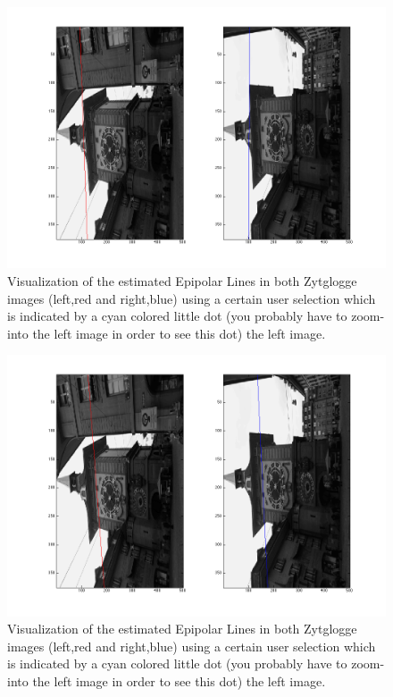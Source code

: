 \documentclass{paper}
\begin{document}
\begin{figure}[H]
\centering
\includegraphics[width=\textwidth]{figures/epi_zyt_2}
\caption{Visualization of the estimated Epipolar Lines in both Zytglogge images (left,red and right,blue) using a certain user selection which is indicated by a cyan colored little dot (you probably have to zoom-into the left image in order to see this dot) the left image.}
\label{fig:zyt_epipolarline_2}
\end{figure}

\begin{figure}[H]
\centering
\includegraphics[width=\textwidth]{figures/epi_zyt_3}
\caption{Visualization of the estimated Epipolar Lines in both Zytglogge images (left,red and right,blue) using a certain user selection which is indicated by a cyan colored little dot (you probably have to zoom-into the left image in order to see this dot) the left image.}
\label{fig:zyt_epipolarline_3}
\end{figure}
\end{document}
